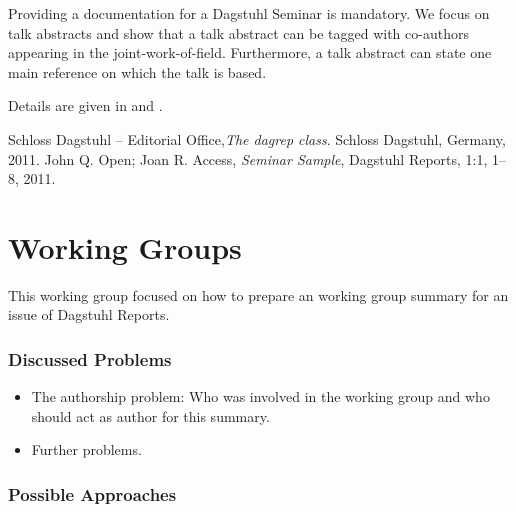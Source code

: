 \documentclass[a4paper,UKenglish]{dagrep}
\begin{document}
\license
{}

Providing a documentation for a Dagstuhl Seminar is mandatory. We focus on talk abstracts and show that a talk abstract can be tagged with co-authors appearing in the joint-work-of-field. Furthermore, a talk abstract can state one main reference on which the talk is based.

Details are given in \cite{dagrep-manual} and \cite{dagrep-sample}.

\begin{thebibliography}{0}
 Schloss Dagstuhl -- Editorial Office,\textsl{The dagrep class}. Schloss Dagstuhl, Germany, 2011.
 John Q. Open; Joan R. Access, \textsl{Seminar Sample}, Dagstuhl Reports, 1:1, 1--8, 2011.
\end{thebibliography}

\section{Working Groups }

\license

This working group focused on how to prepare an working group summary for an issue of Dagstuhl Reports.

\subsubsection{Discussed Problems}

\begin{itemize}
\item The authorship problem: Who was involved in the working group and who should act as author for this summary.
\item Further problems.
\end{itemize}

\subsubsection{Possible Approaches}
\end{document}
